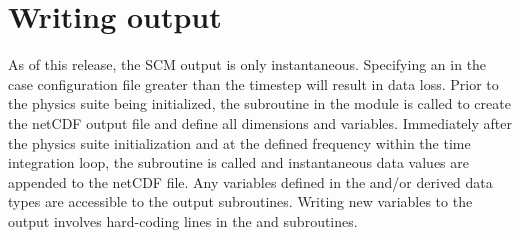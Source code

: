 \section{Writing output}
As of this release, the SCM output is only instantaneous. Specifying an  in the case configuration file greater than the timestep will result in data loss. Prior to the physics suite being initialized, the  subroutine in the  module is called to create the netCDF output file and define all dimensions and variables. Immediately after the physics suite initialization and at the defined frequency within the time integration loop, the  subroutine is called and instantaneous data values are appended to the netCDF file. Any variables defined in the  and/or  derived data types are accessible to the output subroutines. Writing new variables to the output involves hard-coding lines in the  and  subroutines.
